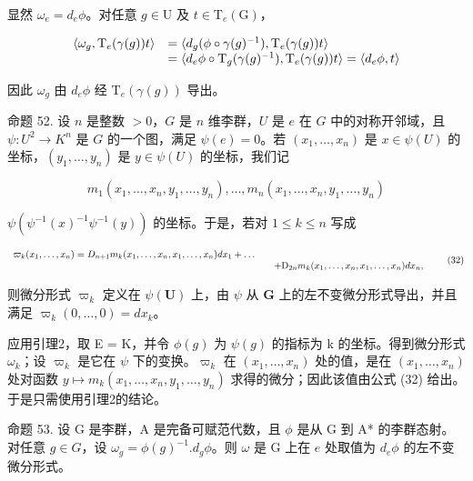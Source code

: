 显然 \(\omega_{e} = d_{e}\phi\)。对任意 \(g \in \mathrm{U}\) 及 \(t \in \mathrm{T}_{e}(\mathrm{G})\)，

\[
\begin{array}{r l} \langle \omega_ {g}, \mathrm{T} _ {e} (\gamma (g)) t \rangle & = \langle d _ {g} (\phi \circ \gamma (g) ^ {- 1}), \mathrm{T} _ {e} (\gamma (g)) t \rangle \\ & = \langle d _ {e} \phi \circ \mathrm{T} _ {g} (\gamma (g) ^ {- 1}), \mathrm{T} _ {e} (\gamma (g)) t \rangle = \langle d _ {e} \phi , t \rangle \end{array}
\]

因此 \(\omega_{g}\) 由 \(d_{e}\phi\) 经 \(\mathrm{T}_{e}(\gamma(g))\) 导出。

命题 52. 设 \(n\) 是整数 \(>0\)，\(G\) 是 \(n\) 维李群，\(U\) 是 \(e\) 在 \(G\) 中的对称开邻域，且 \(\psi: U^2 \to K^n\) 是 \(G\) 的一个图，满足 \(\psi(e) = 0\)。若 \((x_1, \ldots, x_n)\) 是 \(x \in \psi(U)\) 的坐标，\((y_1, \ldots, y_n)\) 是 \(y \in \psi(U)\) 的坐标，我们记

\[
m _ {1} (x _ {1}, \dots , x _ {n}, y _ {1}, \dots , y _ {n}), \dots , m _ {n} (x _ {1}, \dots , x _ {n}, y _ {1}, \dots , y _ {n})
\]

\(\psi (\psi^{-1}(x)^{-1}\psi^{-1}(y))\) 的坐标。于是，若对 \(1\leqslant k\leqslant n\) 写成

\[
\begin{array}{r l} \varpi_ {k} (x _ {1}, \ldots , x _ {n}) = D _ {n + 1} m _ {k} (x _ {1}, \ldots , x _ {n}, x _ {1}, \ldots , x _ {n}) d x _ {1} + \dots \\ & \quad + \mathrm{D} _ {2 n} m _ {k} (x _ {1}, \ldots , x _ {n}, x _ {1}, \ldots , x _ {n}) d x _ {n}, \end{array}\tag{32}
\]

则微分形式 \(\varpi_k\) 定义在 \(\psi(\mathbf{U})\) 上，由 \(\psi\) 从 \(\mathbf{G}\) 上的左不变微分形式导出，并且满足 \(\varpi_k(0,\ldots,0) = dx_k\)。

应用引理2，取 E = K，并令 \(\phi(g)\) 为 \(\psi(g)\) 的指标为 k 的坐标。得到微分形式 \(\omega_{k}\)；设 \(\varpi_{k}\) 是它在 \(\psi\) 下的变换。\(\varpi_{k}\) 在 \((x_{1},\ldots,x_{n})\) 处的值，是在 \((x_{1},\ldots,x_{n})\) 处对函数 \(y\mapsto m_{k}(x_{1},\ldots,x_{n},y_{1},\ldots,y_{n})\) 求得的微分；因此该值由公式 (32) 给出。于是只需使用引理2的结论。

命题 53. 设 G 是李群，A 是完备可赋范代数，且 \(\phi\) 是从 G 到 A* 的李群态射。对任意 \(g \in G\)，设 \(\omega_g = \phi(g)^{-1}.d_g\phi\)。则 \(\omega\) 是 G 上在 \(e\) 处取值为 \(d_e\phi\) 的左不变微分形式。

